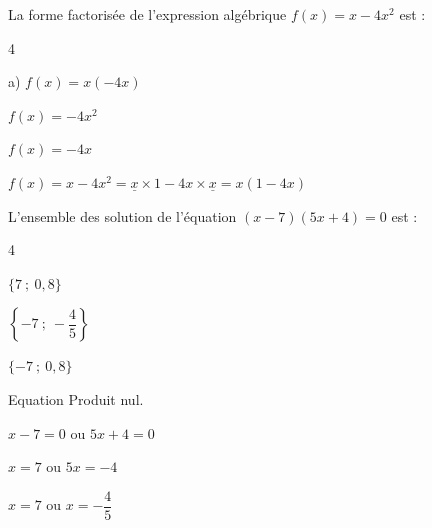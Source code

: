 \documentclass[11pt,a4paper]{article}  %
\begin{document}
\begin{enumMet}
\begin{corrBox}
	\end{corrBox}
	 \item La forme factorisée de l'expression algébrique $f(x)=x-4 x^{2}$ est :
	\begin{multicols}{4}
		\begin{enumMet}
			\item a) $f(x)=x(-4 x)$
			\item $f(x)=-4 x^{2}$
			\item $f(x)=-4 x$
			\item {}
		\end{enumMet}
	\end{multicols}
	\begin{corrBox}
			$f(x)=x-4 x^{2}=\underline{x}\times 1-4x\times \underline{x}=x(1-4x)$		
	\end{corrBox}
	\item L'ensemble des solution de l'équation $(x-7)(5 x+4)=0$ est :
	\begin{multicols}{4}
		\begin{enumMet}
			\item\fbox{$\left\{7\ ;\ -\dfrac{4}{5}\right\}$}
			\item $\{7\ ;\ 0,8\}$
			\item $\left\{-7\ ;\ -\dfrac{4}{5}\right\}$
			\item $\{-7\ ;\ 0,8\}$
		\end{enumMet}
	\end{multicols}
	\begin{corrBox}
		Equation Produit nul.
		
		$x-7=0$ ou $5x+4=0$
		
		$x=7$ ou $5x=-4$
		
		$x=7$ ou $x=-\dfrac{4}{5}$
				
	\end{corrBox}
\end{enumMet}

\exerciceDS{}
\end{document}
